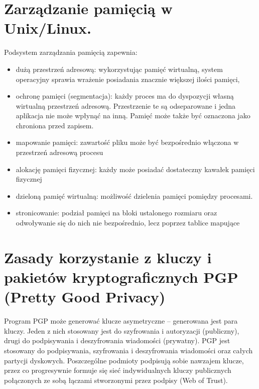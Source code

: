 \documentclass[12pt,a4paper]{article}
\begin{document}
	\section{Zarządzanie pamięcią w Unix/Linux.}
	Podsystem zarządzania pamięcią zapewnia:
	\begin{itemize}
		\item 	dużą przestrzeń adresową: wykorzystując pamięć wirtualną, system operacyjny sprawia wrażenie posiadania znacznie większej ilości pamięci,
		\item ochronę pamięci (segmentacja): każdy proces ma do dyspozycji własną wirtualną przestrzeń adresową. Przestrzenie te są odseparowane i jedna aplikacja nie może wpłynąć na inną. Pamięć może także być oznaczona jako chroniona przed zapisem.
		\item mapowanie pamięci: zawartość pliku może być bezpośrednio włączona w przestrzeń adresową procesu
		\item alokację pamięci fizycznej: każdy może posiadać dostateczny kawałek pamięci fizycznej
		\item dzieloną pamięć wirtualną: możliwość dzielenia pamięci pomiędzy procesami.
		\item stronicowanie: podział pamięci na bloki ustalonego rozmiaru oraz odwoływanie się do nich nie bezpośrednio, lecz poprzez tablice mapujące
	\end{itemize}

	\section{Zasady korzystanie z kluczy i pakietów kryptograficznych PGP (Pretty Good Privacy)}
	Program PGP może generować klucze asymetryczne -- generowana jest para kluczy. Jeden z nich stosowany jest do szyfrowania i autoryzacji (publiczny), drugi do podpisywania i deszyfrowania wiadomości (prywatny). PGP jest stosowany do podpisywania, szyfrowania i deszyfrowania wiadomości oraz całych partycji dyskowych. Poszczególne podmioty podpisują sobie nawzajem klucze, przez co progresywnie formuje się sieć indywidualnych kluczy publicznych połączonych ze sobą łączami stworzonymi przez podpisy (Web of Trust).
\end{document}
